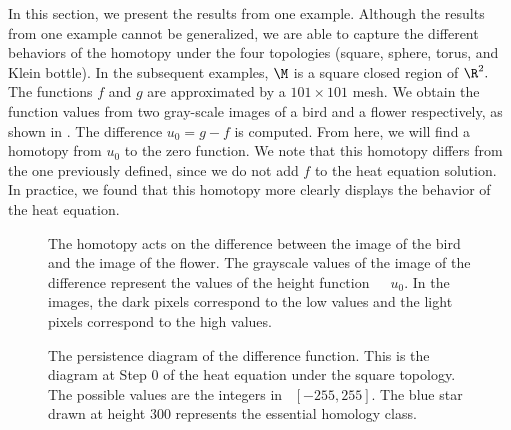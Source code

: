 In this section, we present the results from one example.  Although the results
from one example cannot be generalized, we are able to capture the different
behaviors of the homotopy under the four topologies (square, sphere, torus, and 
Klein bottle).  In the subsequent examples, $\M$ is a square closed region of 
$\R^2.$    The functions  $f$ and $g$ are approximated by a $101 \times 101$ 
mesh.  We obtain the function values from two gray-scale images of a bird and 
a flower respectively, as shown in .  The difference 
$u_0=g-f$ is computed.  From here, we will find a homotopy from $u_0$ to the 
zero function.  We note that this homotopy differs from the one previously
defined, since we do not add $f$ to the heat equation solution.
In practice, we found that this homotopy more clearly displays the behavior of the
heat equation.
\begin{figure}[ht] \centering
	\caption[Images of the Homotopy]{The homotopy acts on the difference
                between the image of the bird and the image of the flower.
                The grayscale values of the image of the difference represent
                the values of the height function　\ $u_0$.  In the images,
                the dark pixels correspond to the low values and the light
                pixels correspond to the high values.
                }\label{fig:htpyImages}
\end{figure}
\begin{figure}[hbt] \vspace*{0.1in}
 \centering
 \centerline{}
 \caption{The persistence diagram of the difference function.  This is the diagram
          at Step $0$ of the heat equation under the square topology.  The
          possible values are the integers in ~$[-255,255]$.  The blue
          star drawn at height $300$ represents the essential homology class.}
 \label{fig-01:Sumi}
\end{figure}


